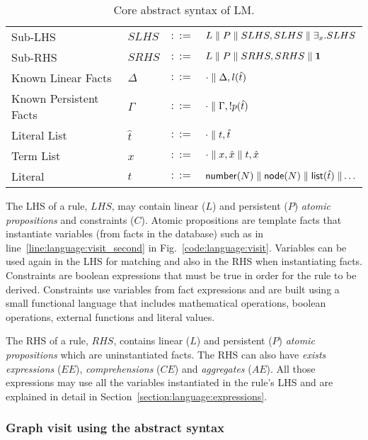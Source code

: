 \begin{table}[h]
\begin{tabular}{ l l c l }
  Sub-LHS & $SLHS$ & $::=$ & $L \; \Vert \; P \; \Vert \; SLHS, SLHS \; \Vert \; \exists_{x}. SLHS$\\
  Sub-RHS & $SRHS$ & $::=$ & $L \; \Vert \; P \; \Vert \; SRHS, SRHS \; \Vert \; \mathbf{1}$\\
  
  Known Linear Facts & $\Delta$ & $::=$ & $\cdot \; \Vert \; \Delta, l(\hat{t})$ \\
  Known Persistent Facts & $\Gamma$ & $::=$ & $\cdot \; \Vert \; \Gamma, {!} p(\hat{t})$ \\

  Literal List & $\hat{t}$ & $::=$ & $\cdot \; \Vert \; t, \hat{t}$ \\
  Term List & $\hat{x}$ & $::=$ & $\cdot \; \Vert \; x, \hat{x} \; \Vert \; t, \hat{x}$ \\
  Literal & $t$ & $::=$ & $\mathsf{number}(N) \; \Vert \; \mathsf{node}(N) \; \Vert \; \mathsf{list}(\hat{t}) \; \Vert \ldots$ \\
\end{tabular}
\caption{Core abstract syntax of LM.}\label{tbl:language:ast}
\end{table}

The LHS of a rule, $LHS$, may contain linear ($L$) and persistent ($P$)
\emph{atomic propositions} and constraints ($C$). Atomic propositions are
template facts that instantiate variables (from facts in the database) such as
 in line~\ref{line:language:visit_second} in
Fig.~\ref{code:language:visit}. Variables can be used again in the LHS for
matching and also in the RHS when instantiating facts.  Constraints are boolean
expressions that must be true in order for the rule to be derived. Constraints
use variables from fact expressions and are built using a small functional
language that includes mathematical operations, boolean operations, external
functions and literal values.

The RHS of a rule, $RHS$, contains linear ($L$) and persistent ($P$)
\emph{atomic propositions} which are uninstantiated facts. The RHS can also have
\emph{exists expressions} ($EE$), \emph{comprehensions} ($CE$) and
\emph{aggregates} ($AE$). All those expressions may use all the variables
instantiated in the rule's LHS and are explained in detail in
Section~\ref{section:language:expressions}.

\subsubsection{Graph visit using the abstract syntax}\label{visit:ast}

